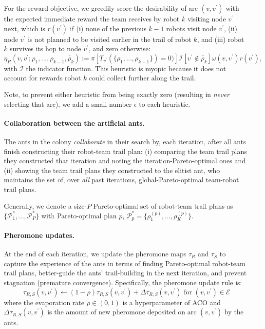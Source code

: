 \documentclass[11pt, oneside]{article}
\begin{document}
For the reward objective, we greedily score the desirability of arc $(v, v^\prime)$ with the expected immediate reward the team receives by robot $k$ visiting node $v^\prime$ next, which is $r(v^\prime)$ if 
(i) none of the previous $k-1$ robots visit node $v^\prime$, 
(ii) node $v^\prime$ is not planned to be visited earlier in the trail of robot $k$, and
(iii) robot $k$ survives its hop to node $v^\prime$,
and zero otherwise:
\begin{equation}
	\eta_R(v, v^\prime; \rho_1, ..., \rho_{k-1}, \tilde{\rho_k}) :=  
	 \pi[ T_{v^\prime}(\{\rho_1, ..., \rho_{k-1}\}) = 0)] \mathcal{I}[v^\prime \notin \tilde{\rho_k}] \omega(v, v^\prime) r(v^\prime ) ,
\end{equation}
with $\mathcal{I}$ the indicator function.
This heuristic is myopic because it does not account for rewards robot $k$ could collect further along the trail. 

Note, to prevent either heuristic from being exactly zero (resulting in \emph{never} selecting that arc), we add a small number $\epsilon$ to each heuristic.

\paragraph{Collaboration between the artificial ants.}
The ants in the colony \emph{collaborate} in their search by, each iteration, after all ants finish constructing their robot-team trail plan:
(i) comparing the team trail plans they constructed that iteration and noting the iteration-Pareto-optimal ones and
(ii) showing the team trail plans they constructed to the elitist ant, who maintains the set of, over \emph{all} past iterations, global-Pareto-optimal team-robot trail plans.

Generally, we denote a size-$P$ Pareto-optimal set of robot-team trail plans as $\{\mathcal{P}_1^*, ..., \mathcal{P}_P^*\}$ with Pareto-optimal plan $p$, $\mathcal{P}^*_p=\{\rho_1^{(p)}, ..., \rho_K^{(p)}\}$.


\paragraph{Pheromone updates.} At the end of each iteration, we update the pheromone maps $\tau_R$ and $\tau_S$ to capture the experience of the ants in terms of finding Pareto-optimal robot-team trail plans, better-guide the ants' trail-building in the next iteration, and  prevent stagnation (premature convergence). Specifically, the pheromone update rule is:
\begin{equation}
	\tau_{R, S}(v, v^\prime) \leftarrow (1-\rho) \tau_{R,S}(v, v^\prime)  + \Delta \tau_{R,S}(v, v^\prime) \text{ for } (v, v^\prime) \in \mathcal{E} \label{eq:tau_update}
\end{equation}
where the evaporation rate $\rho \in (0, 1)$ is a hyperparameter of ACO and $\Delta \tau_{R,S}(v, v^\prime)$ is the amount of new pheromone deposited on arc $(v, v^\prime)$ by the ants.
\end{document}
